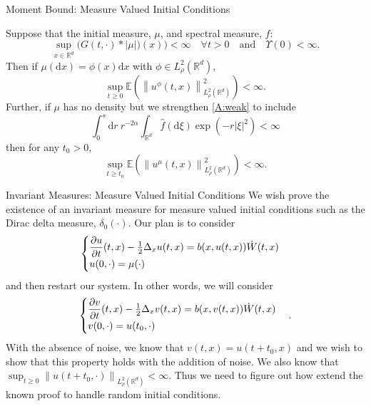 \documentclass{beamer}%
\numberwithin{equation}{section}
\newcommand{\R}{\mathbb{R}}
\newcommand{\Norm}[1]{\left\|  #1   \right\|}
\newcommand{\ud}{\ensuremath{\mathrm{d} }}
\begin{document}
\begin{frame}{Moment Bound: Measure Valued Initial Conditions}
\begin{Theorem}
	Suppose that the initial measure, $\mu$, and spectral measure, $\hat{f}$:
	\begin{equation}
	\label{A:weak}
		\sup_{x\in \R^d}	\big(G(t,\cdot)*|\mu|)(x) \big) < \infty \quad \forall t>0 \quad \text{and} \quad \Upsilon(0) < \infty.
	\end{equation}
	Then if $\mu(\ud x) = \phi(x) \ud x$ with $\phi \in L^2_{\rho}(\R^d)$,
	\[
		\sup_{t \ge 0} \mathbb{E}\left( \Norm{u^\phi(t,x)}_{L^2_{\rho}(\R^d)}^2 \right) < \infty.
	\]
	Further, if $\mu$ has no density but we strengthen \eqref{A:weak} to include
		\[
		\int_0^s \ud r \: r^{-2\alpha} \int_{\R^{d}} \hat f(\ud \xi) \exp\left(-r|\xi|^2 \right) < \infty
		\]
	then for any $t_0 >0$,
		\[
			\sup_{t \ge t_0} \mathbb{E}\left( \Norm{u^\mu(t,x)}_{L^2_{\rho}(\R^d)}^2 \right) < \infty.
		\]
\end{Theorem}
\end{frame}

\begin{frame}{Invariant Measures: Measure Valued Initial Conditions}
We wish prove the existence of an invariant measure for measure valued initial conditions such as the Dirac delta measure, $\delta_0(\cdot)$. Our plan is to consider 
	\[
	\begin{cases}
	\dfrac{\partial u}{\partial t}(t,x)- \frac{1}{2}\Delta_xu(t,x) = b(x, u(t,x))\dot{W}(t,x) &
	\\ u(0,\cdot) = \mu(\cdot)  &
	\end{cases} \vspace{.1in}
	\]
and then restart our system. In other words, we will consider 
			\[
	\begin{cases}
	\dfrac{\partial v}{\partial t}(t,x)- \frac{1}{2}\Delta_xv(t,x) = b(x, v(t,x))\dot{W}(t,x) &
	\\ v(0,\cdot) = u(t_0,\cdot)  &
	\end{cases} \vspace{.1in}.
	\]
With the absence of noise, we know that $v(t,x) = u(t+t_0,x)$ and we wish to show that this property holds with the addition of noise. We also know that $\sup_{t\ge0}\Norm{u(t+t_0,\cdot)}_{L^2_{\rho}(\R^d)} < \infty$. Thus we need to figure out how extend the known proof to handle random initial conditions. 
\end{frame}
\end{document}
